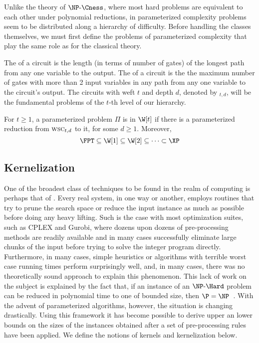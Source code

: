 Unlike the theory of $\NPcness$, where most hard problems are equivalent to each other under polynomial reductions, in parameterized complexity problems seem to be distributed along a hierarchy of difficulty.
Before handling the classes themselves, we must first define the problems of parameterized complexity that play the same role as  for the classical theory. 

The  of a circuit is the length (in terms of number of gates) of the longest path from any one variable to the output.
The  of a circuit is the the maximum number of gates with more than 2 input variables in any path from any one variable to the circuit's output.
The circuits with weft $t$ and depth $d$, denoted by $_{t,d}$, will be the fundamental problems of the $t$-th level of our hierarchy.


\begin{class_definition*}[$\W$-hierarchy]
    For $t \geq 1$, a parameterized problem $\Pi$ is in $\W[t]$ if there is a parameterized reduction from $\textsc{wsc}_{t,d}$ to it, for some $d \geq 1$. Moreover,
    \begin{equation*}
        \FPT \subseteq \W[1] \subseteq \W[2] \subseteq \cdots \subset \XP
    \end{equation*}
\end{class_definition*}


\subsection{Kernelization}

One of the broadest class of techniques to be found in the realm of computing is perhaps that of .
Every real system, in one way or another, employs routines that try to prune the search space or reduce the input instance as much as possible before doing any heavy lifting.
Such is the case with most optimization suites, such as CPLEX and Gurobi, where dozens upon dozens of pre-processing methods are readily available and in many cases successfully eliminate large chunks of the input before trying to solve the integer program directly.
Furthermore, in many cases, simple heuristics or algorithms with terrible worst case running times perform surprisingly well, and, in many cases, there was no theoretically sound approach to explain this phenomenon.
This lack of work on the subject is explained by the fact that, if an instance of an $\NPH$ problem can be reduced in polynomial time to one of bounded size, then $\P = \NP$~\citep{book-kernels}.
With the advent of parameterized algorithms, however, the situation is changing drastically.
Using this framework it has become possible to derive upper an lower bounds on the sizes of the instances obtained after a set of pre-processing rules have been applied.
We define the notions of kernels and kernelization below.

